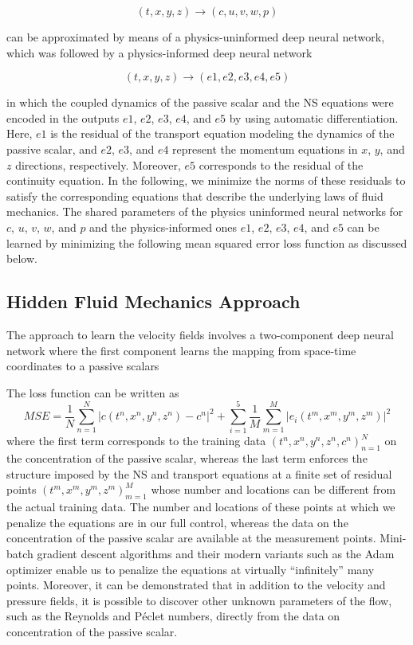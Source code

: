 \documentclass[book.tex]{subfiles}
\begin{document}
\[(t,x,y,z)\rightarrow(c, u, v,w,p)\]

can be approximated by means of a physics-uninformed deep neural network, which was followed by a physics-informed deep neural network

\[(t, x, y, z)\rightarrow(e1, e2, e3, e4, e5)\] 

in which the coupled dynamics of the passive scalar and the NS equations were encoded in the outputs $e1$, $e2$, $e3$, $e4$, and $e5$ by using automatic differentiation. Here, $e1$ is the residual of the transport equation modeling the dynamics of the passive scalar, and $e2$, $e3$, and $e4$ represent the momentum equations in $x$, $y$, and $z$ directions, respectively. Moreover, $e5$ corresponds to the residual of the continuity equation. In the following, we minimize the norms of these residuals to satisfy the corresponding equations that describe the underlying laws of fluid mechanics. The shared parameters of the physics uninformed neural networks for $c$, $u$, $v$, $w$, and $p$ and the physics-informed ones $e1$, $e2$, $e3$, $e4$, and $e5$ can be learned by minimizing the following mean squared error loss function as discussed below.
\subsection{Hidden Fluid Mechanics Approach}
The approach to learn the velocity fields involves a two-component deep neural network where the first component learns the mapping from space-time coordinates to a passive scalars


The loss function can be written as
\begin{equation}
MSE=\frac{1}{N}\sum_{n=1}^{N}|c(t^n,x^n,y^n,z^n)-c^n|^2+\sum_{i=1}^{5}\frac{1}{M}\sum_{m=1}^{M}|e_i(t^m,x^m,y^m,z^m)|^2
\end{equation}
where the first term corresponds to the training data $(t^n,x^n,y^n,z^n,c^n)_{n=1}^{N}$ on the concentration
of the passive scalar, whereas the last term enforces the structure imposed by the NS and transport equations at a finite set of residual points $(t^m,x^m,y^m,z^m)_{m=1}^{M}$ whose number and locations can be different from the
actual training data. The number and locations of these points at which we penalize the equations are in our full control, whereas the data on the concentration of the passive scalar are available at the measurement points. Mini-batch gradient descent algorithms and their modern variants such as the Adam optimizer enable us to penalize the equations at virtually “infinitely” many points. Moreover, it can be demonstrated that in addition to the velocity and pressure fields, it is possible to discover other unknown parameters of the flow, such as the Reynolds
and P$é$clet numbers, directly from the data on concentration of the passive scalar.
\end{document}
